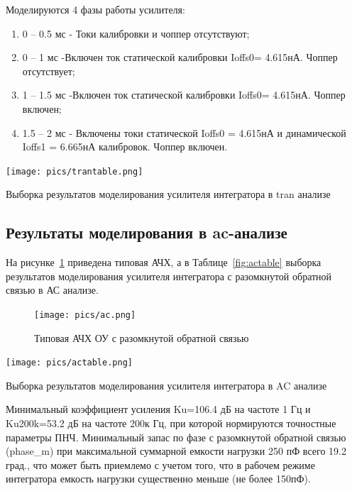 \documentclass[a4paper,12pt,oneside]{scrartcl}
\begin{document}
Моделируются 4 фазы работы усилителя: 

\begin{enumerate}
    \item 0 – 0.5 мс - Токи калибровки и чоппер отсутствуют;
    \item 0 – 1 мс -Включен ток статической калибровки Ioffs0= 4.615нА. Чоппер отсутствует;
    \item 1 – 1.5 мс -Включен ток статической калибровки Ioffs0= 4.615нА. Чоппер включен;
    \item 1.5 – 2 мс  - Включены токи статической Ioffs0 = 4.615нА и динамической Ioffs1 = 6.665нА  калибровок. Чоппер включен.
\end{enumerate}

\begin{table}[!htb]
    \centering
    \texttt{[image: pics/trantable.png]}
    \caption{Выборка результатов моделирования усилителя интегратора в tran анализе}
    \label{fig:trantable}
\end{table}
\FloatBarrier






\subsection{Результаты моделирования в ac-анализе}

На рисунке~\ref{fig:Aс} приведена типовая АЧХ, а в Таблице~\ref{fig:actable} выборка результатов моделирования усилителя интегратора с разомкнутой обратной связью в АС анализе.

\begin{figure}[!htb]
\centering
\texttt{[image: pics/ac.png]}
\caption{Типовая АЧХ ОУ с разомкнутой обратной связью}
\label{fig:Aс}
\end{figure}

\begin{table}[!htb]
    \centering
    \texttt{[image: pics/actable.png]}
    \caption{Выборка результатов моделирования усилителя интегратора в AC анализе}
    \label{fig:actable}
\end{table}
\FloatBarrier

Минимальный коэффициент усиления Ku=106.4 дБ на частоте 1 Гц и Ku200k=53.2 дБ на частоте 200к Гц, при которой нормируются точностные параметры ПНЧ.
Минимальный запас по фазе с разомкнутой обратной связью (phase\_m) при максимальной суммарной емкости нагрузки 250 пФ всего 19.2 град., что может быть приемлемо с учетом того, что в рабочем режиме интегратора емкость нагрузки существенно меньше (не более 150пФ).
\end{document}
